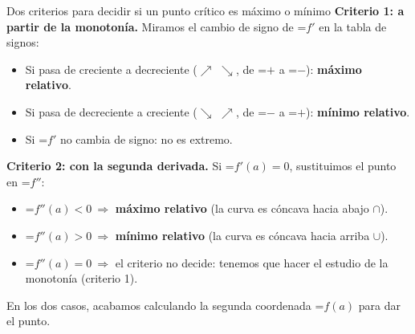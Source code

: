 \documentclass[11pt,a4paper]{article}
\newcommand{\lt}{<}\newcommand{\gt}{>}
\newcommand{\fmm}[1]{\setbox0=\hbox{$#1$}\ifdim\wd0>\linewidth\[#1\]\else\mbox{\box0}\fi}
\begin{document}
  
\begin{fmdef}{Dos criterios para decidir si un punto crítico es máximo o mínimo}
\textbf{Criterio 1: a partir de la monotonía.} Miramos el cambio de signo de \fmm{f'} en la tabla de signos:

      
\begin{itemize}
\item Si pasa de creciente a decreciente ($\nearrow$ $\searrow$, de \fmm{+} a \fmm{-}): \textbf{máximo relativo}.
\item Si pasa de decreciente a creciente ($\searrow$ $\nearrow$, de \fmm{-} a \fmm{+}): \textbf{mínimo relativo}.
\item Si \fmm{f'} no cambia de signo: no es extremo.
\end{itemize}

      

\textbf{Criterio 2: con la segunda derivada.} Si \fmm{f'(a)=0}, sustituimos el punto en \fmm{f''}:

      
\begin{itemize}
\item \fmm{f''(a)\lt0\ \Rightarrow} \textbf{máximo relativo} (la curva es cóncava hacia abajo $\cap$).
\item \fmm{f''(a)\gt0\ \Rightarrow} \textbf{mínimo relativo} (la curva es cóncava hacia arriba $\cup$).
\item \fmm{f''(a)=0\ \Rightarrow} el criterio no decide: tenemos que hacer el estudio de la monotonía (criterio 1).
\end{itemize}

      

En los dos casos, acabamos calculando la segunda coordenada \fmm{f(a)} para dar el punto.
\end{fmdef}
\end{document}
